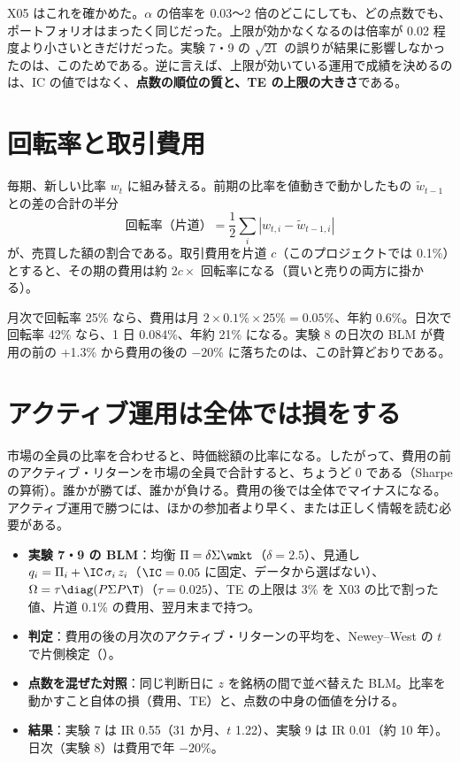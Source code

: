 X05 はこれを確かめた。$\alpha$ の倍率を 0.03〜2 倍のどこにしても、どの点数でも、ポートフォリオはまったく同じだった。上限が効かなくなるのは倍率が 0.02 程度より小さいときだけだった。実験 7・9 の $\sqrt{21}$ の誤りが結果に影響しなかったのは、このためである。逆に言えば、上限が効いている運用で成績を決めるのは、IC の値ではなく、\textbf{点数の順位の質と、TE の上限の大きさ}である。

\section{回転率と取引費用}

毎期、新しい比率 $w_t$ に組み替える。前期の比率を値動きで動かしたもの $\tilde w_{t-1}$ との差の合計の半分
\begin{equation}
\text{回転率（片道）} = \frac{1}{2}\sum_i \left| w_{t,i} - \tilde w_{t-1,i} \right|
\end{equation}
が、売買した額の割合である。取引費用を片道 $c$（このプロジェクトでは 0.1\%）とすると、その期の費用は約 $2c\times$ 回転率になる（買いと売りの両方に掛かる）。

\begin{exbox}
月次で回転率 25\% なら、費用は月 $2\times0.1\%\times25\% = 0.05\%$、年約 0.6\%。日次で回転率 42\% なら、1 日 0.084\%、年約 21\% になる。実験 8 の日次の BLM が費用の前の +1.3\% から費用の後の $-20\%$ に落ちたのは、この計算どおりである。
\end{exbox}

\section{アクティブ運用は全体では損をする}

市場の全員の比率を合わせると、時価総額の比率になる。したがって、費用の前のアクティブ・リターンを市場の全員で合計すると、ちょうど 0 である（Sharpe の算術）。誰かが勝てば、誰かが負ける。費用の後では全体でマイナスになる。アクティブ運用で勝つには、ほかの参加者より早く、または正しく情報を読む必要がある。

\begin{projbox}
\begin{itemize}
\item \textbf{実験 7・9 の BLM}：均衡 $\Pi=\delta\Sigma\wmkt$（$\delta=2.5$）、見通し $q_i = \Pi_i + \IC\,\sigma_i\,z_i$（$\IC=0.05$ に固定、データから選ばない）、$\Omega=\tau\diag(P\Sigma P\T)$（$\tau=0.025$）、TE の上限は 3\% を X03 の比で割った値、片道 0.1\% の費用、翌月末まで持つ。
\item \textbf{判定}：費用の後の月次のアクティブ・リターンの平均を、Newey--West の $t$ で片側検定（）。
\item \textbf{点数を混ぜた対照}：同じ判断日に $z$ を銘柄の間で並べ替えた BLM。比率を動かすこと自体の損（費用、TE）と、点数の中身の価値を分ける。
\item \textbf{結果}：実験 7 は IR 0.55（31 か月、$t$ 1.22）、実験 9 は IR 0.01（約 10 年）。日次（実験 8）は費用で年 $-20\%$。
\end{itemize}
\end{projbox}

